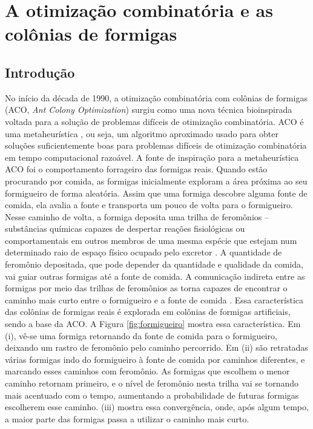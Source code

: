 \chapter{A otimização combinatória e as colônias de formigas}
\label{chapter:aco}

\section{Introdução}

No início da década de 1990, a otimização combinatória com colônias de formigas
(ACO, \textit{Ant Colony
Optimization}) \cite{dorigo1992optimization, dorigo1991positive, dorigo1996ant} surgiu como uma
nova técnica bioinspirada voltada para a solução de problemas difíceis
de otimização combinatória. ACO é uma metaheurística \cite{glover2003handbook},
ou seja, um algoritmo aproximado usado para obter soluções suficientemente
boas para problemas difíceis de otimização combinatória em tempo computacional
razoável. A fonte de inspiração para a metaheurística ACO foi o comportamento
forrageiro das formigas reais. Quando estão procurando por comida, as formigas
inicialmente exploram a área próxima ao seu formigueiro de forma aleatória.
Assim que uma formiga descobre alguma fonte de comida, ela avalia a fonte e
transporta um pouco de volta para o formigueiro. Nesse caminho de volta, a
formiga deposita uma trilha de feromônios --
substâncias químicas capazes de despertar reações fisiológicas ou
comportamentais em outros membros de uma mesma espécie que estejam num
determinado raio de espaço físico ocupado pelo excretor
\cite{karlson1959pheromones}. A quantidade de feromônio depositada, que pode
depender da quantidade e qualidade da comida, vai guiar outras formigas até a
fonte de comida. A comunicação indireta entre as formigas por meio das trilhas
de feromônios as torna capazes de encontrar o caminho mais curto entre o
formigueiro e a fonte de comida \cite{deneubourg1990self}. Essa característica
das colônias de formigas reais é explorada em colônias de formigas
artificiais, sendo a base da ACO. A Figura \ref{fig:formigueiro} mostra essa
característica. Em (i), vê-se uma formiga retornando da fonte de comida para o
formigueiro, deixando um rastro de feromônio pelo caminho percorrido. Em (ii)
são retratadas várias formigas indo do formigueiro à fonte de comida por
caminhos diferentes, e marcando esses caminhos com feromônio. As formigas que
escolhem o menor caminho retornam primeiro, e o nível de feromônio nesta
trilha vai se tornando mais acentuado com o tempo, aumentando a probabilidade
de futuras formigas escolherem esse caminho. (iii) mostra essa convergência,
onde, após algum tempo, a maior parte das formigas passa a utilizar o caminho
mais curto.

